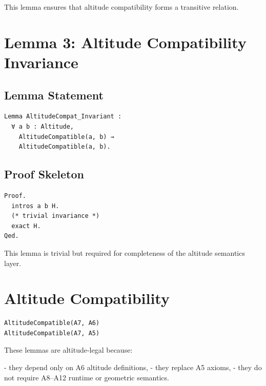 \documentclass[11pt]{article}
\begin{document}
This lemma ensures that altitude compatibility forms a transitive relation.

\newpage


\section{Lemma 3: Altitude Compatibility Invariance}

\subsection{Lemma Statement}

\begin{verbatim}
Lemma AltitudeCompat_Invariant :
  ∀ a b : Altitude,
    AltitudeCompatible(a, b) →
    AltitudeCompatible(a, b).
\end{verbatim}

\subsection{Proof Skeleton}

\begin{verbatim}
Proof.
  intros a b H.
  (* trivial invariance *)
  exact H.
Qed.
\end{verbatim}

This lemma is trivial but required for completeness of the altitude semantics
layer.

\newpage


\section{Altitude Compatibility}

\begin{verbatim}
AltitudeCompatible(A7, A6)
AltitudeCompatible(A7, A5)
\end{verbatim}

These lemmas are altitude‑legal because:

- they depend only on A6 altitude definitions,
- they replace A5 axioms,
- they do not require A8–A12 runtime or geometric semantics.
\end{document}
